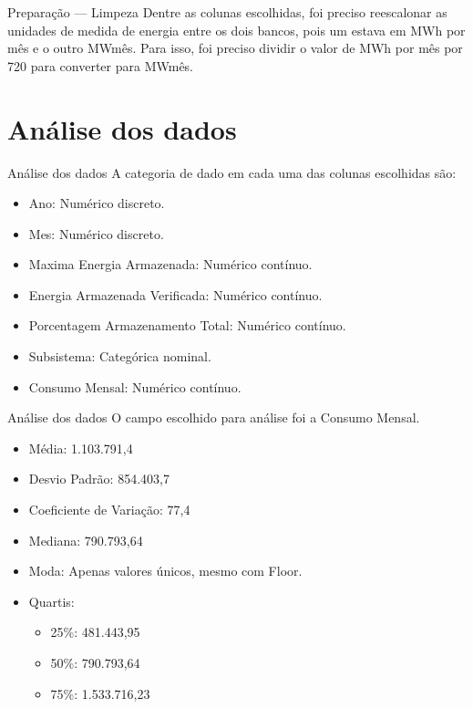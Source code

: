 \documentclass[12pt]{beamer}
\begin{document}
\begin{frame}{Preparação — Limpeza}
  Dentre as colunas escolhidas, foi preciso reescalonar as unidades de medida de energia entre os dois bancos, pois um estava em MWh por mês e o outro MWmês. Para isso, foi preciso  dividir o valor de MWh por mês por 720 para converter para MWmês.
\end{frame}

\section{Análise dos dados}
\begin{frame}{Análise dos dados}
A categoria de dado em cada uma das colunas escolhidas são:
  \begin{itemize}
    \item Ano: Numérico discreto.
    \item Mes: Numérico discreto.
    \item Maxima Energia Armazenada: Numérico contínuo.
    \item Energia Armazenada Verificada: Numérico contínuo.
    \item Porcentagem Armazenamento Total: Numérico contínuo.
    \item Subsistema: Categórica nominal.
    \item Consumo Mensal: Numérico contínuo.
  \end{itemize}  
\end{frame} 

\begin{frame}{Análise dos dados}
  O campo escolhido para análise foi a Consumo Mensal.
  \begin{itemize}
    \item Média: 1.103.791,4
    \item Desvio Padrão: 854.403,7
    \item Coeficiente de Variação: 77,4
    \item Mediana: 790.793,64
    \item Moda: Apenas valores únicos, mesmo com Floor.
    \item Quartis:
    \begin{itemize}
      \item 25\%: 481.443,95
      \item 50\%: 790.793,64
      \item 75\%: 1.533.716,23
    \end{itemize}
  \end{itemize}
\end{frame}
\end{document}
